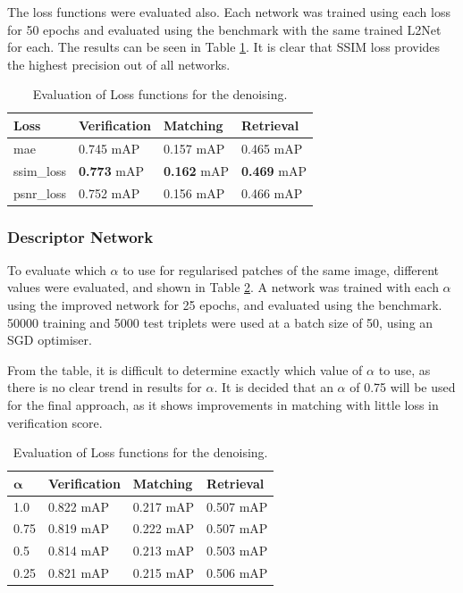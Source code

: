 \documentclass[10pt,twocolumn,letterpaper]{article}
\begin{document}
The loss functions were evaluated also. Each network was trained using each loss for 50 epochs and evaluated using the benchmark with the same trained L2Net for each. The results can be seen in Table \ref{tab:denoise_loss}. It is clear that SSIM loss provides the highest precision out of all networks.


\begin{table}[H]
\begin{tabular}{|l|l|l|l|}
\hline
\textbf{Loss} & \textbf{Verification} & \textbf{Matching} & \textbf{Retrieval} \\ \hline
mae                    & 0.745 mAP                   & 0.157 mAP               & 0.465 mAP                \\ 
ssim\_loss             & \textbf{0.773} mAP          & \textbf{0.162} mAP      & \textbf{0.469} mAP       \\ 
psnr\_loss             & 0.752 mAP                   & 0.156 mAP               & 0.466 mAP                \\ \hline
\end{tabular}
\caption{Evaluation of Loss functions for the denoising.}
\label{tab:denoise_loss}
\end{table}
 
\subsubsection{Descriptor Network}

To evaluate which $\alpha$ to use for regularised patches of the same image, different values were evaluated, and shown in Table \ref{tab:alpha_eval}. A network was trained with each $\alpha$ using the improved network for 25 epochs, and evaluated using the benchmark. 50000 training and 5000 test triplets were used at a batch size of 50, using an SGD optimiser.

From the table, it is difficult to determine exactly which value of $\alpha$ to use, as there is no clear trend in results for $\alpha$. It is decided that an $\alpha$ of 0.75 will be used for the final approach, as it shows improvements in matching with little loss in verification score.

\begin{table}[H]
\centering
\begin{tabular}{|l|l|l|l|}
\hline
$\mathbf{\alpha}$ & \textbf{Verification} & \textbf{Matching} & \textbf{Retrieval} \\ \hline
1.0  & 0.822 mAP & 0.217 mAP & 0.507 mAP \\ 
0.75 & 0.819 mAP & 0.222 mAP & 0.507 mAP \\ 
0.5  & 0.814 mAP & 0.213 mAP & 0.503 mAP \\ 
0.25 & 0.821 mAP & 0.215 mAP & 0.506 mAP \\ 
\hline
\end{tabular}
\caption{Evaluation of Loss functions for the denoising.}
\label{tab:alpha_eval}
\end{table}
\end{document}

